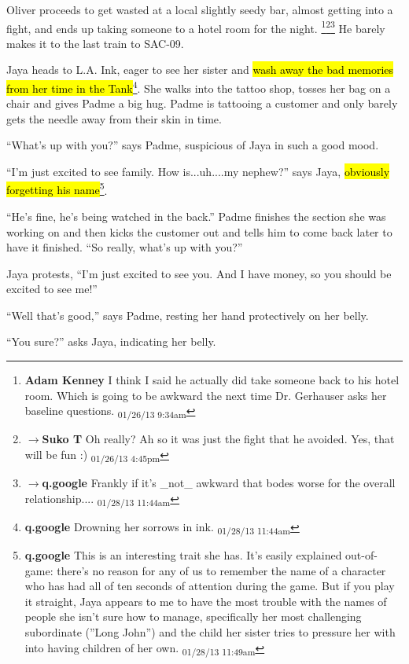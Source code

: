Oliver proceeds to get wasted at a local slightly seedy bar, almost getting into a fight, and ends up taking someone to a hotel room for the night. \footnote{\textbf{Adam Kenney }I think I said he actually did take someone back to his hotel room. Which is going to be awkward the next time Dr. Gerhauser asks her baseline questions. \textsubscript{01/26/13 9:34am}}\footnote{$\rightarrow$\textbf{Suko T }Oh really?  Ah so it was just the fight that he avoided.  Yes, that will be fun :) \textsubscript{01/26/13 4:45pm}}\footnote{$\rightarrow$\textbf{q.google }Frankly if it's \_not\_ awkward that bodes worse for the overall relationship.... \textsubscript{01/28/13 11:44am}} He barely makes it to the last train to SAC-09.



Jaya heads to L.A. Ink, eager to see her sister and \hl{wash away the bad memories from her time in the Tank}\footnote{\textbf{q.google }Drowning her sorrows in ink. \textsubscript{01/28/13 11:44am}}.  She walks into the tattoo shop, tosses her bag on a chair and gives Padme a big hug.  Padme is tattooing a customer and only barely gets the needle away from their skin in time.

``What's up with you?'' says Padme, suspicious of Jaya in such a good mood.

``I'm just excited to see family.  How is...uh....my nephew?'' says Jaya, \hl{obviously forgetting his name}\footnote{\textbf{q.google }This is an interesting trait she has.  It's easily explained out-of-game: there's no reason for any of us to remember the name of a character who has had all of ten seconds of attention during the game.  But if you play it straight, Jaya appears to me to have the most trouble with the names of people she isn't sure how to manage, specifically her most challenging subordinate (''Long John'') and the child her sister tries to pressure her with into having children of her own. \textsubscript{01/28/13 11:49am}}.

``He's fine, he's being watched in the back.''  Padme finishes the section she was working on and then kicks the customer out and tells him to come back later to have it finished.  ``So really, what's up with you?''

Jaya protests, ``I'm just excited to see you. And I have money, so you should be excited to see me!''

``Well that's good,'' says Padme, resting her hand protectively on her belly.

``You sure?'' asks Jaya, indicating her belly.

